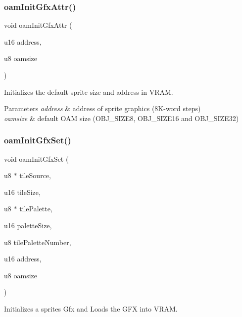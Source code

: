 \subsubsection{\texorpdfstring{oam\+Init\+Gfx\+Attr()}{oamInitGfxAttr()}}
{\footnotesize\ttfamily void oam\+Init\+Gfx\+Attr (\begin{DoxyParamCaption}\item[{u16}]{address,  }\item[{u8}]{oamsize }\end{DoxyParamCaption})}



Initializes the default sprite size and address in V\+R\+AM. 


\begin{DoxyParams}{Parameters}
{\em address} & address of sprite graphics (8\+K-\/word steps) \\
\hline
{\em oamsize} & default O\+AM size (O\+B\+J\+\_\+\+S\+I\+Z\+E8, O\+B\+J\+\_\+\+S\+I\+Z\+E16 and O\+B\+J\+\_\+\+S\+I\+Z\+E32) \\
\hline
\end{DoxyParams}
\mbox{\label{a00365_a46e0be47f8fc865a7f43c1b0b126e59a}} 
\subsubsection{\texorpdfstring{oam\+Init\+Gfx\+Set()}{oamInitGfxSet()}}
{\footnotesize\ttfamily void oam\+Init\+Gfx\+Set (\begin{DoxyParamCaption}\item[{u8 $\ast$}]{tile\+Source,  }\item[{u16}]{tile\+Size,  }\item[{u8 $\ast$}]{tile\+Palette,  }\item[{u16}]{palette\+Size,  }\item[{u8}]{tile\+Palette\+Number,  }\item[{u16}]{address,  }\item[{u8}]{oamsize }\end{DoxyParamCaption})}



Initializes a sprites Gfx and Loads the G\+FX into V\+R\+AM. 


